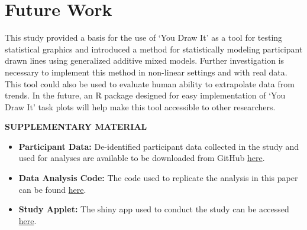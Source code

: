 \documentclass[12pt]{article}
\providecommand{\tightlist}{%
  \setlength{\itemsep}{0pt}\setlength{\parskip}{0pt}}
\begin{document}
\hypertarget{future-work}{%
\section{Future Work}\label{future-work}}

This study provided a basis for the use of `You Draw It' as a tool for
testing statistical graphics and introduced a method for statistically
modeling participant drawn lines using generalized additive mixed
models. Further investigation is necessary to implement this method in
non-linear settings and with real data. This tool could also be used to
evaluate human ability to extrapolate data from trends. In the future,
an R package designed for easy implementation of `You Draw It' task
plots will help make this tool accessible to other researchers.

\begin{center}
{\large\bf SUPPLEMENTARY MATERIAL}
\end{center}

\begin{itemize}
\tightlist
\item
  \textbf{Participant Data:} De-identified participant data collected in
  the study and used for analyses are available to be downloaded from
  GitHub
  \href{https://github.com/earobinson95/Eye-Fitting-Straight-Lines-in-the-Modern-Era/tree/main/data}{here}.
\item
  \textbf{Data Analysis Code:} The code used to replicate the analysis
  in this paper can be found
  \href{https://earobinson95.github.io/Eye-Fitting-Straight-Lines-in-the-Modern-Era/analysis/you-draw-it-eyefitting-analysis.html}{here}.
\item
  \textbf{Study Applet:} The shiny app used to conduct the study can be
  accessed \href{https://shiny.srvanderplas.com/you-draw-it/}{here}.
\end{itemize}



\end{document}
